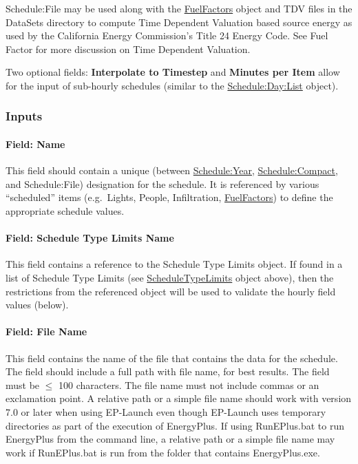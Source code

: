 Schedule:File may be used along with the \hyperref[fuelfactors]{FuelFactors} object and TDV files in the DataSets directory to compute Time Dependent Valuation based source energy as used by the California Energy Commission's Title 24 Energy Code. See Fuel Factor for more discussion on Time Dependent Valuation.

Two optional fields: \textbf{Interpolate to Timestep} and \textbf{Minutes per Item} allow for the input of sub-hourly schedules (similar to the \hyperref[scheduledaylist]{Schedule:Day:List} object).

\subsubsection{Inputs}\label{inputs-9-019}

\paragraph{Field: Name}\label{field-name-8-018}

This field should contain a unique (between \hyperref[scheduleyear]{Schedule:Year}, \hyperref[schedulecompact]{Schedule:Compact}, and Schedule:File) designation for the schedule. It is referenced by various ``scheduled'' items (e.g.~Lights, People, Infiltration, \hyperref[fuelfactors]{FuelFactors}) to define the appropriate schedule values.

\paragraph{Field: Schedule Type Limits Name}\label{field-schedule-type-limits-name-6}

This field contains a reference to the Schedule Type Limits object. If found in a list of Schedule Type Limits (see \hyperref[scheduletypelimits]{ScheduleTypeLimits} object above), then the restrictions from the referenced object will be used to validate the hourly field values (below).

\paragraph{Field: File Name}\label{field-file-name}

This field contains the name of the file that contains the data for the schedule. The field should include a full path with file name, for best results. The field must be \(\le\) 100 characters. The file name must not include commas or an exclamation point. A relative path or a simple file name should work with version 7.0 or later when using EP-Launch even though EP-Launch uses temporary directories as part of the execution of EnergyPlus. If using RunEPlus.bat to run EnergyPlus from the command line, a relative path or a simple file name may work if RunEPlus.bat is run from the folder that contains EnergyPlus.exe.

